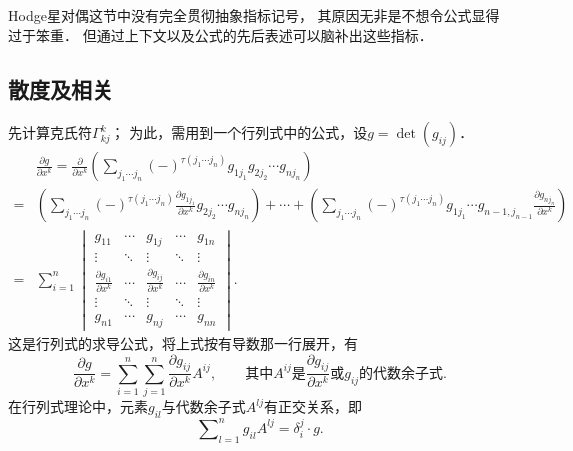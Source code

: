 \begin{remark}
	Hodge星对偶这节中没有完全贯彻抽象指标记号，
	其原因无非是不想令公式显得过于笨重．
	但通过上下文以及公式的先后表述可以脑补出这些指标．
\end{remark}



\subsection{散度及相关}
先计算克氏符$\Gamma^k_{kj}$；
为此，需用到一个行列式中的公式，设$g=\det(g_{ij})$．
\begin{align*}
    &\frac{\partial g}{\partial x^k}= \frac{\partial }{\partial x^k}
    \left( \sum_{j_1 \cdots j_n} (-)^{\tau(j_1 \cdots j_n)}
    g_{1 j_1} g_{2 j_2}\cdots g_{n j_n} \right) \\ %
    =&\left( \sum_{j_1 \cdots j_n} (-)^{\tau(j_1 \cdots j_n)}
    \frac{\partial g_{1 j_1}}{\partial x^k} g_{2 j_2}\cdots g_{n j_n} \right)
    +\cdots + \left( \sum_{j_1 \cdots j_n} (-)^{\tau(j_1 \cdots j_n)}
    g_{1 j_1} \cdots g_{n-1, j_{n-1}} \frac{\partial g_{n j_n}}{\partial x^k}  \right) \\
    =& \sum_{i=1}^{n}
    \begin{vmatrix}
        g_{1 1} & \cdots & g_{1 j} & \cdots & g_{1 n} \\
        \vdots & \ddots & \vdots & \ddots & \vdots \\
        \frac{\partial g_{i 1}}{\partial x^k} & \cdots &
           \frac{\partial g_{i j}}{\partial x^k} & \cdots &
           \frac{\partial g_{i n}}{\partial x^k} \\
        \vdots & \ddots & \vdots & \ddots & \vdots \\
        g_{n 1} & \cdots & g_{n j} & \cdots & g_{nn}
    \end{vmatrix} .
\end{align*}  %
这是行列式的求导公式，将上式按有导数那一行展开，有
\begin{equation}\label{chrg:eqn_detga}
    \frac{\partial g}{\partial x^k}= \sum_{i=1}^{n} \sum_{j=1}^{n}
    \frac{\partial g_{ij}}{\partial x^k} A^{ij}, \qquad
    \text{其中}A^{ij}\text{是}\frac{\partial g_{ij}}{\partial x^k}\text{或}g_{ij}\text{的代数余子式}.
\end{equation}
在行列式理论中，元素$g_{il}$与代数余子式$A^{lj}$有正交关系，即
\begin{equation}
    \sum\nolimits_{l=1}^{n}g_{il} A^{lj} = \delta_i^j \cdot g .
\end{equation}
